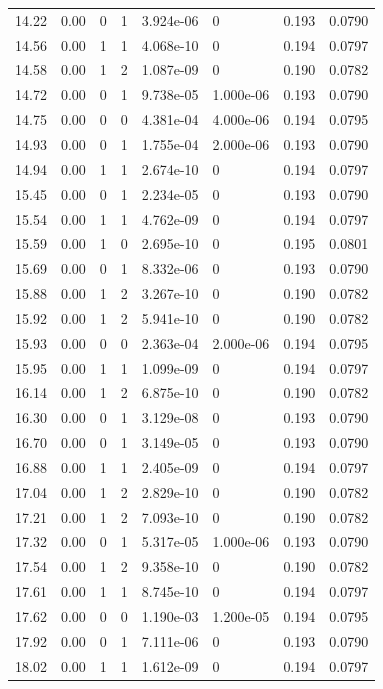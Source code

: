 \documentclass[preview]{standalone}
\begin{document}
{{{\begin{tabular}{L{1.2cm}C{1.2cm} C{0.3cm}C{0.5cm} C{1.4cm}C{1.4cm} C{1.4cm}C{1.4cm}}
  14.22  &  0.00  & 0     &  1 &  3.924e-06  & 0  & 0.193 &  0.0790   \\ 
  14.56  &  0.00  & 1     &  1 &  4.068e-10  & 0  & 0.194 &  0.0797   \\ 
  14.58  &  0.00  & 1     &  2 &  1.087e-09  & 0  & 0.190 &  0.0782   \\ 
  14.72  &  0.00  & 0     &  1 &  9.738e-05  & 1.000e-06  & 0.193 &  0.0790   \\ 
  14.75  &  0.00  & 0     &  0 &  4.381e-04  & 4.000e-06  & 0.194 &  0.0795   \\ 
  14.93  &  0.00  & 0     &  1 &  1.755e-04  & 2.000e-06  & 0.193 &  0.0790   \\ 
  14.94  &  0.00  & 1     &  1 &  2.674e-10  & 0  & 0.194 &  0.0797   \\ 
  15.45  &  0.00  & 0     &  1 &  2.234e-05  & 0  & 0.193 &  0.0790   \\ 
  15.54  &  0.00  & 1     &  1 &  4.762e-09  & 0  & 0.194 &  0.0797   \\ 
  15.59  &  0.00  & 1     &  0 &  2.695e-10  & 0  & 0.195 &  0.0801   \\ 
  15.69  &  0.00  & 0     &  1 &  8.332e-06  & 0  & 0.193 &  0.0790   \\ 
  15.88  &  0.00  & 1     &  2 &  3.267e-10  & 0  & 0.190 &  0.0782   \\ 
  15.92  &  0.00  & 1     &  2 &  5.941e-10  & 0  & 0.190 &  0.0782   \\ 
  15.93  &  0.00  & 0     &  0 &  2.363e-04  & 2.000e-06  & 0.194 &  0.0795   \\ 
  15.95  &  0.00  & 1     &  1 &  1.099e-09  & 0  & 0.194 &  0.0797   \\ 
  16.14  &  0.00  & 1     &  2 &  6.875e-10  & 0  & 0.190 &  0.0782   \\ 
  16.30  &  0.00  & 0     &  1 &  3.129e-08  & 0  & 0.193 &  0.0790   \\ 
  16.70  &  0.00  & 0     &  1 &  3.149e-05  & 0  & 0.193 &  0.0790   \\ 
  16.88  &  0.00  & 1     &  1 &  2.405e-09  & 0  & 0.194 &  0.0797   \\ 
  17.04  &  0.00  & 1     &  2 &  2.829e-10  & 0  & 0.190 &  0.0782   \\ 
  17.21  &  0.00  & 1     &  2 &  7.093e-10  & 0  & 0.190 &  0.0782   \\ 
  17.32  &  0.00  & 0     &  1 &  5.317e-05  & 1.000e-06  & 0.193 &  0.0790   \\ 
  17.54  &  0.00  & 1     &  2 &  9.358e-10  & 0  & 0.190 &  0.0782   \\ 
  17.61  &  0.00  & 1     &  1 &  8.745e-10  & 0  & 0.194 &  0.0797   \\ 
  17.62  &  0.00  & 0     &  0 &  1.190e-03  & 1.200e-05  & 0.194 &  0.0795   \\ 
  17.92  &  0.00  & 0     &  1 &  7.111e-06  & 0  & 0.193 &  0.0790   \\ 
  18.02  &  0.00  & 1     &  1 &  1.612e-09  & 0  & 0.194 &  0.0797   \\ 
\hline 
\end{tabular} 

}}}
\end{document}
